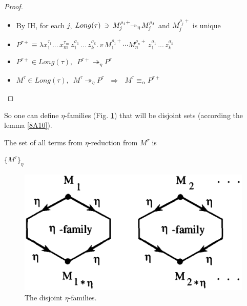 \documentclass[a4paper,10pt]{article}
\begin{document}
\begin{lem}
\begin{proof}
\begin{itemize}
     \begin{itemize}
      \item By IH, for each $j$, $Long(\tau)\,\,\, \mbox{\reflectbox{$\in$}} \,\,\,M_j^{\rho_j +} \!\! \twoheadrightarrow_{\eta} \!M_j^{\rho_j}$ and $M_j^{\rho_j +}$ is unique\\[0.3 cm]
      \item $P^{\tau +} \equiv \lambda x_1^{\tau_1} ... \,x_m^{\tau_m} \, z_1^{\sigma_1}\,...\, z_k^{\sigma_k} . \, v\, M^{\rho_1 +}_1 \cdots M^{\rho_n +}_n \, z_1^{\sigma_1}\,...\, z_k^{\sigma_k}$\\[0.3 cm]
      \item $P^{\tau +} \in Long(\tau), \,\,\, P^{\tau +}\twoheadrightarrow_{\eta} P^{\tau}$\\[0.3 cm]
      \item $M^{\tau} \in Long(\tau), \,\,\, M^{\tau}\twoheadrightarrow_{\eta} P^{\tau} \,\,\,\,\Longrightarrow \,\,\,\,M^{\tau} \equiv_{\alpha} P^{\tau +}$\\
     \end{itemize}
 \end{itemize}
\end{proof}
\end{lem}

So one can define $\eta$-families (Fig. \ref{fig1}) that will be disjoint sets (according the lemma \ref{8A10}).

\begin{mydef}

  \begin{notation}The set of all terms from $\eta$-reduction from
    $M^{\tau}$ is
     \begin{center}
     $\{M^{\tau}\}_\eta$
     \end{center}
  \end{notation}

\end{mydef}

\begin{figure}[h]
   \centering
   \includegraphics[scale=0.4]{fig1.png}
   \caption{The disjoint $\eta$-families.}
   \label{fig1}
\end{figure}
\end{document}
